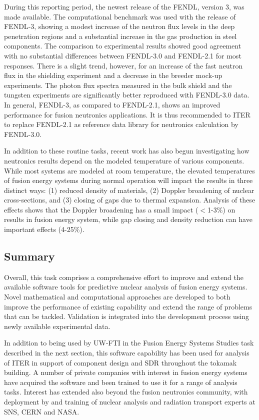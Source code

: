 During this reporting period, the newest release of the \gls{FENDL}, version
3, was made available.  The computational benchmark was used with the
release of \gls{FENDL}-3, showing a modest increase of the neutron flux levels
in the deep penetration regions and a substantial increase in the gas
production in steel components.  The comparison to experimental results showed
good agreement with no substantial differences between FENDL-3.0 and FENDL-2.1
for most responses.  There is a slight trend, however, for an increase of the
fast neutron flux in the shielding experiment and a decrease in the breeder
mock-up experiments. The photon flux spectra measured in the bulk shield and
the tungsten experiments are significantly better reproduced with FENDL-3.0
data. In general, FENDL-3, as compared to FENDL-2.1, shows an improved
performance for fusion neutronics applications. It is thus recommended to ITER
to replace FENDL-2.1 as reference data library for neutronics calculation by
FENDL-3.0.\cite{fischer_benchmarking_2014, bohm_impact_2015}

In addition to these routine tasks, recent work has also begun investigating
how neutronics results depend on the modeled temperature of various
components.  While most systems are modeled at room temperature, the elevated
temperatures of fusion energy systems during normal operation will impact the
results in three distinct ways: (1) reduced density of materials, (2) Doppler
broadening of nuclear cross-sections, and (3) closing of gaps due to thermal
expansion.  Analysis of these effects shows that the Doppler broadening has a
small impact ($<$1-3\%) on results in fusion energy system, while gap closing
and density reduction can have important effects (4-25\%).

\subsection{Summary}

Overall, this task comprises a comprehensive effort to improve and extend the
available software tools for predictive nuclear analysis of fusion energy
systems.  Novel mathematical and computational approaches are developed to
both improve the performance of existing capability and extend the range of
problems that can be tackled.  Validation is integrated into the development
process using newly available experimental data.

In addition to being used by \gls{UW-FTI} in the Fusion Energy Systems Studies
task described in the next section, this software capability has been used for
analysis of ITER in support of component design and \gls{SDR} throughout the
tokamak building.  A number of private companies with interest in fusion
energy systems have acquired the software and been trained to use it for a
range of analysis tasks.  Interest has extended also beyond the fusion
neutronics community, with deployment by and training of nuclear analysis and
radiation transport experts at \gls{SNS}, CERN and NASA.

